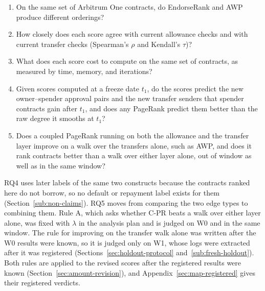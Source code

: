 \begin{enumerate}
\item[RQ1.] On the same set of Arbitrum One contracts, do EndorseRank and AWP produce different orderings?
\item[RQ2.] How closely does each score agree with current allowance checks and with current transfer checks (Spearman's $\rho$ and Kendall's $\tau$)?
\item[RQ3.] What does each score cost to compute on the same set of contracts, as measured by time, memory, and iterations?
\item[RQ4.] Given scores computed at a freeze date $t_1$, do the scores predict the new owner--spender approval pairs and the new transfer senders that spender contracts gain after $t_1$, and does any PageRank predict them better than the raw degree it smooths at $t_1$?
\item[RQ5.] Does a coupled PageRank running on both the allowance and the transfer layer improve on a walk over the transfers alone, such as AWP, and does it rank contracts better than a walk over either layer alone, out of window as well as in the same window?
\end{enumerate}

RQ4 uses later labels of the same two constructs because the contracts ranked here do not borrow, so no default or repayment label exists for them (Section~\ref{sub:non-claims}). RQ5 moves from comparing the two edge types to combining them. Rule A, which asks whether C-PR beats a walk over either layer alone, was fixed with $\lambda$ in the analysis plan and is judged on W0 and in the same window. The rule for improving on the transfer walk alone was written after the W0 results were known, so it is judged only on W1, whose logs were extracted after it was registered (Sections~\ref{sec:holdout-protocol} and~\ref{sub:fresh-holdout}). Both rules are applied to the revised scores after the registered results were known (Section~\ref{sec:amount-revision}), and Appendix~\ref{sec:map-registered} gives their registered verdicts.


